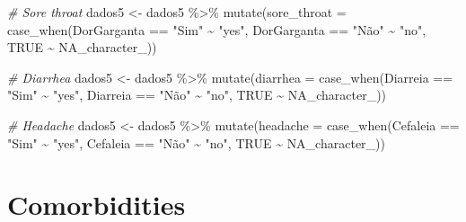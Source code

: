 \documentclass[
]{article}
\newenvironment{Shaded}{\begin{snugshade}}{\end{snugshade}}
\newcommand{\AttributeTok}[1]{\textcolor[rgb]{0.77,0.63,0.00}{#1}}
\newcommand{\CommentTok}[1]{\textcolor[rgb]{0.56,0.35,0.01}{\textit{#1}}}
\newcommand{\ConstantTok}[1]{\textcolor[rgb]{0.00,0.00,0.00}{#1}}
\newcommand{\FunctionTok}[1]{\textcolor[rgb]{0.00,0.00,0.00}{#1}}
\newcommand{\NormalTok}[1]{#1}
\newcommand{\OtherTok}[1]{\textcolor[rgb]{0.56,0.35,0.01}{#1}}
\newcommand{\SpecialCharTok}[1]{\textcolor[rgb]{0.00,0.00,0.00}{#1}}
\newcommand{\StringTok}[1]{\textcolor[rgb]{0.31,0.60,0.02}{#1}}
\begin{document}
\begin{Shaded}
\begin{Highlighting}[]
\CommentTok{\# Sore throat  }
\NormalTok{dados5 }\OtherTok{\textless{}{-}}\NormalTok{  dados5 }\SpecialCharTok{\%\textgreater{}\%}
  \FunctionTok{mutate}\NormalTok{(}\AttributeTok{sore\_throat =} \FunctionTok{case\_when}\NormalTok{(DorGarganta }\SpecialCharTok{==} \StringTok{"Sim"} \SpecialCharTok{\textasciitilde{}} \StringTok{"yes"}\NormalTok{,}
\NormalTok{                              DorGarganta }\SpecialCharTok{==} \StringTok{"Não"} \SpecialCharTok{\textasciitilde{}} \StringTok{"no"}\NormalTok{,}
                              \ConstantTok{TRUE} \SpecialCharTok{\textasciitilde{}} \ConstantTok{NA\_character\_}\NormalTok{))}

\CommentTok{\# Diarrhea}
\NormalTok{dados5 }\OtherTok{\textless{}{-}}\NormalTok{  dados5 }\SpecialCharTok{\%\textgreater{}\%}
  \FunctionTok{mutate}\NormalTok{(}\AttributeTok{diarrhea =} \FunctionTok{case\_when}\NormalTok{(Diarreia }\SpecialCharTok{==} \StringTok{"Sim"} \SpecialCharTok{\textasciitilde{}} \StringTok{"yes"}\NormalTok{,}
\NormalTok{                              Diarreia }\SpecialCharTok{==} \StringTok{"Não"} \SpecialCharTok{\textasciitilde{}} \StringTok{"no"}\NormalTok{,}
                              \ConstantTok{TRUE} \SpecialCharTok{\textasciitilde{}} \ConstantTok{NA\_character\_}\NormalTok{))}

\CommentTok{\# Headache}
\NormalTok{dados5 }\OtherTok{\textless{}{-}}\NormalTok{  dados5 }\SpecialCharTok{\%\textgreater{}\%}
  \FunctionTok{mutate}\NormalTok{(}\AttributeTok{headache =} \FunctionTok{case\_when}\NormalTok{(Cefaleia }\SpecialCharTok{==} \StringTok{"Sim"} \SpecialCharTok{\textasciitilde{}} \StringTok{"yes"}\NormalTok{,}
\NormalTok{                              Cefaleia }\SpecialCharTok{==} \StringTok{"Não"} \SpecialCharTok{\textasciitilde{}} \StringTok{"no"}\NormalTok{,}
                              \ConstantTok{TRUE} \SpecialCharTok{\textasciitilde{}} \ConstantTok{NA\_character\_}\NormalTok{))}
\end{Highlighting}
\end{Shaded}

\hypertarget{comorbidities}{%
\section{Comorbidities}\label{comorbidities}}
\end{document}
